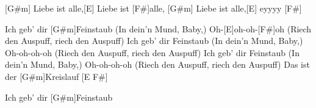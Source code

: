 \begin{guitar}
	[G#m] Liebe ist alle,[E] Liebe ist [F#]alle, 
	[G#m] Liebe ist alle,[E] eyyyy [F#]{}
	
	Ich geb' dir [G#m]Feinstaub (In dein'n Mund, Baby,)
	Oh-[E]oh-oh-[F#]oh (Riech den Auspuff, riech den Auspuff)
	Ich geb' dir Feinstaub (In dein'n Mund, Baby,)
	Oh-oh-oh-oh (Riech den Auspuff, riech den Auspuff)
	Ich geb' dir Feinstaub (In dein'n Mund, Baby,)
	Oh-oh-oh-oh (Riech den Auspuff, riech den Auspuff)
	Das ist der [G#m]Kreislauf [E F#]{}
	
	Ich geb' dir [G#m]Feinstaub
\end{guitar}
